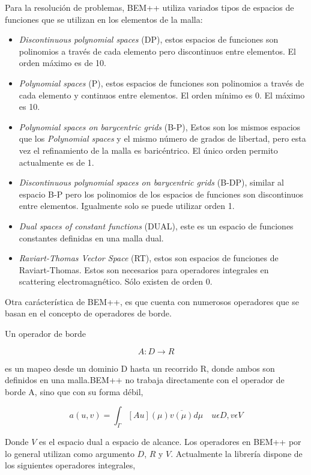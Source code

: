 \documentclass[12pt,letterpaper]{article}
\numberwithin{equation}{section}
\begin{document}
Para la resolución de problemas, BEM++ utiliza variados tipos de espacios de funciones que se utilizan en los elementos de la malla:

\begin{itemize}
	\item \textit{Discontinuous polynomial spaces} (DP), estos espacios de funciones son polinomios a través de cada elemento pero discontinuos entre elementos. El orden máximo es de 10.
	\item \textit{Polynomial spaces} (P), estos espacios de funciones son polinomios a través de cada elemento y continuos entre elementos. El orden mínimo es 0. El máximo es 10.
	\item \textit{Polynomial spaces on barycentric grids} (B-P), Estos son los mismos espacios que los \textit{Polynomial spaces} y el mismo número de grados de libertad, pero esta vez el refinamiento de la malla es baricéntrico. El único orden permito actualmente es de 1.
	\item \textit{Discontinuous polynomial spaces on barycentric grids} (B-DP), similar al espacio B-P pero los polinomios de los espacios de funciones son discontinuos entre elementos. Igualmente solo se puede utilizar orden 1.
	\item \textit{Dual spaces of constant functions} (DUAL), este es un espacio de funciones constantes definidas en una malla dual.
	\item \textit{Raviart-Thomas Vector Space} (RT), estos son espacios de funciones de Raviart-Thomas. Estos son necesarios para operadores integrales en scattering electromagnético. Sólo existen de orden 0.
\end{itemize}


Otra carácterística de BEM++, es que cuenta con numerosos operadores que se basan en el concepto de operadores de borde.

Un operador de borde

$$A\colon D\rightarrow R$$

es un mapeo desde un dominio D hasta un recorrido R, donde ambos son definidos en una malla.BEM++ no trabaja directamente con el operador de borde A, sino que con su forma débil,

$$a(u,v)=\int_{\Gamma}\left[ Au\right](\mu) \overline{v(\mu)} d\mu \quad u\epsilon D,v\epsilon V $$

\noindent Donde $V$ es el espacio dual a espacio de alcance. Los operadores en BEM++ por lo general utilizan como argumento $D$, $R$ y $V$. Actualmente la librería dispone de los siguientes operadores integrales,
\end{document}
